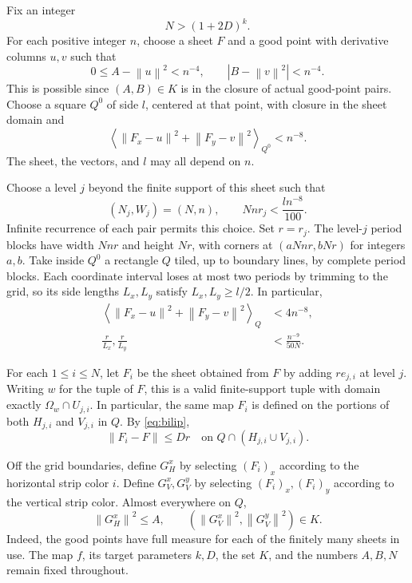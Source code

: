 \documentclass[11pt]{article}
\newcommand{\norm}[1]{\left\lVert#1\right\rVert}
\begin{document}
Fix an integer
\begin{equation}\label{eq:N}
 N>(1+2D)^k.
\end{equation}
For each positive integer $n$, choose a sheet $F$ and a good point with derivative columns $u,v$ such that
\begin{equation}\label{eq:nearmax}
 0\le A-\norm u^2<n^{-4},\qquad
 |B-\norm v^2|<n^{-4}.
\end{equation}
This is possible since $(A,B)\in K$ is in the closure of actual good-point pairs. Choose a square $Q^0$ of side $l$, centered at that point, with closure in the sheet domain and
\begin{equation}\label{eq:baseerror}
 \left\langle\norm{F_x-u}^2+\norm{F_y-v}^2\right\rangle_{Q^0}<n^{-8}.
\end{equation}
The sheet, the vectors, and $l$ may all depend on $n$.

Choose a level $j$ beyond the finite support of this sheet such that
\begin{equation}\label{eq:fine}
 (N_j,W_j)=(N,n),\qquad Nnr_j<\frac{l n^{-8}}{100}.
\end{equation}
Infinite recurrence of each pair permits this choice. Set $r=r_j$. The level-$j$ period blocks have width $Nnr$ and height $Nr$, with corners at $(aNnr,bNr)$ for integers $a,b$. Take inside $Q^0$ a rectangle $Q$ tiled, up to boundary lines, by complete period blocks. Each coordinate interval loses at most two periods by trimming to the grid, so its side lengths $L_x,L_y$ satisfy $L_x,L_y\ge l/2$. In particular,
\begin{align}
 \left\langle\norm{F_x-u}^2+\norm{F_y-v}^2\right\rangle_Q&<4n^{-8},\label{eq:Qerror}\\
 \frac r{L_x},\frac r{L_y}&<\frac{n^{-9}}{50N}.\label{eq:ratio}
\end{align}

For each $1\le i\le N$, let $F_i$ be the sheet obtained from $F$ by adding $re_{j,i}$ at level $j$. Writing $w$ for the tuple of $F$, this is a valid finite-support tuple with domain exactly $\Omega_w\cap U_{j,i}$. In particular, the same map $F_i$ is defined on the portions of both $H_{j,i}$ and $V_{j,i}$ in $Q$. By \eqref{eq:bilip},
\begin{equation}\label{eq:offset}
 \norm{F_i-F}\le Dr
 \quad\text{on }Q\cap(H_{j,i}\cup V_{j,i}).
\end{equation}

Off the grid boundaries, define $G_H^x$ by selecting $(F_i)_x$ according to the horizontal strip color $i$. Define $G_V^x,G_V^y$ by selecting $(F_i)_x,(F_i)_y$ according to the vertical strip color. Almost everywhere on $Q$,
\begin{equation}\label{eq:Kbounds}
 \norm{G_H^x}^2\le A,\qquad
 (\norm{G_V^x}^2,\norm{G_V^y}^2)\in K.
\end{equation}
Indeed, the good points have full measure for each of the finitely many sheets in use. The map $f$, its target parameters $k,D$, the set $K$, and the numbers $A,B,N$ remain fixed throughout.
\end{document}
